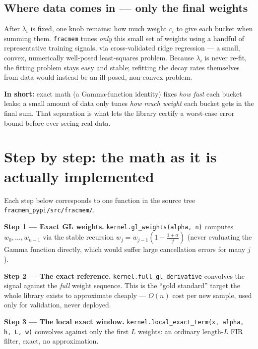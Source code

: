 \documentclass[11pt]{article}
\begin{document}
\subsection{Where data comes in --- only the final weights}
After $\lambda_i$ is fixed, one knob remains: how much weight $c_i$ to give each bucket when summing them. \texttt{fracmem} tunes \emph{only} this small set of weights using a handful of representative training signals, via cross-validated ridge regression --- a small, convex, numerically well-posed least-squares problem. Because $\lambda_i$ is never re-fit, the fitting problem stays easy and stable; refitting the decay rates themselves from data would instead be an ill-posed, non-convex problem.

\begin{recap}
\textbf{In short:} exact math (a Gamma-function identity) fixes \emph{how fast} each bucket leaks; a small amount of data only tunes \emph{how much weight} each bucket gets in the final sum. That separation is what lets the library certify a worst-case error bound before ever seeing real data.
\end{recap}

\section{Step by step: the math as it is actually implemented}

Each step below corresponds to one function in the source tree \texttt{fracmem\_pypi/src/fracmem/}.

\begin{stepbox}
\textbf{Step 1 --- Exact GL weights.} \texttt{kernel.gl\_weights(alpha, n)} computes $w_0,\dots,w_{n-1}$ via the stable recursion $w_j = w_{j-1}(1-\tfrac{1+\alpha}{j})$ (never evaluating the Gamma function directly, which would suffer large cancellation errors for many $j$).
\end{stepbox}

\begin{stepbox}
\textbf{Step 2 --- The exact reference.} \texttt{kernel.full\_gl\_derivative} convolves the signal against the \emph{full} weight sequence. This is the ``gold standard'' target the whole library exists to approximate cheaply --- $O(n)$ cost per new sample, used only for validation, never deployed.
\end{stepbox}

\begin{stepbox}
\textbf{Step 3 --- The local exact window.} \texttt{kernel.local\_exact\_term(x, alpha, h, L, w)} convolves against only the first $L$ weights: an ordinary length-$L$ FIR filter, exact, no approximation.
\end{stepbox}
\end{document}
